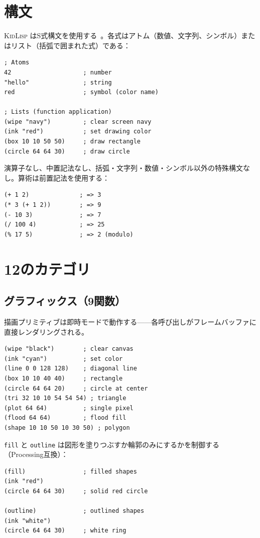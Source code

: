 \documentclass[10pt,letterpaper,twocolumn]{article}
\newcommand{\kl}{\textsc{KidLisp}}
\begin{document}
\section{構文}

\kl{} はS式構文を使用する~\citep{mccarthy1960recursive}。各式はアトム（数値、文字列、シンボル）またはリスト（括弧で囲まれた式）である：

\begin{lstlisting}
; Atoms
42                    ; number
"hello"               ; string
red                   ; symbol (color name)

; Lists (function application)
(wipe "navy")         ; clear screen navy
(ink "red")           ; set drawing color
(box 10 10 50 50)     ; draw rectangle
(circle 64 64 30)     ; draw circle
\end{lstlisting}

演算子なし、中置記法なし、括弧・文字列・数値・シンボル以外の特殊構文なし。算術は前置記法を使用する：

\begin{lstlisting}
(+ 1 2)              ; => 3
(* 3 (+ 1 2))        ; => 9
(- 10 3)             ; => 7
(/ 100 4)            ; => 25
(% 17 5)             ; => 2 (modulo)
\end{lstlisting}

\section{12のカテゴリ}

\subsection{グラフィックス（9関数）}

描画プリミティブは即時モードで動作する——各呼び出しがフレームバッファに直接レンダリングされる。

\begin{lstlisting}
(wipe "black")        ; clear canvas
(ink "cyan")          ; set color
(line 0 0 128 128)    ; diagonal line
(box 10 10 40 40)     ; rectangle
(circle 64 64 20)     ; circle at center
(tri 32 10 10 54 54 54) ; triangle
(plot 64 64)          ; single pixel
(flood 64 64)         ; flood fill
(shape 10 10 50 10 30 50) ; polygon
\end{lstlisting}

\texttt{fill} と \texttt{outline} は図形を塗りつぶすか輪郭のみにするかを制御する（Processing互換）：

\begin{lstlisting}
(fill)                ; filled shapes
(ink "red")
(circle 64 64 30)     ; solid red circle

(outline)             ; outlined shapes
(ink "white")
(circle 64 64 30)     ; white ring
\end{lstlisting}
\end{document}
